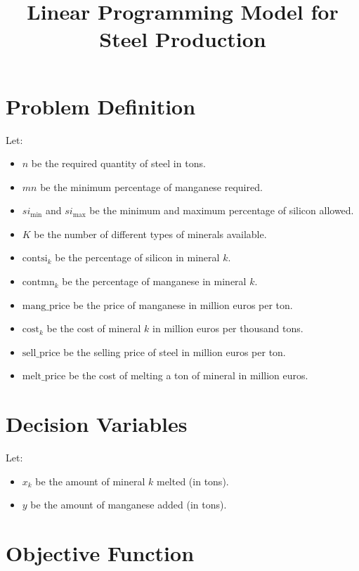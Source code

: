 \documentclass{article}
\begin{document}
\title{Linear Programming Model for Steel Production}
\author{}
\date{}
\maketitle

\section*{Problem Definition}

Let:
\begin{itemize}
    \item \( n \) be the required quantity of steel in tons.
    \item \( mn \) be the minimum percentage of manganese required.
    \item \( si_{\text{min}} \) and \( si_{\text{max}} \) be the minimum and maximum percentage of silicon allowed.
    \item \( K \) be the number of different types of minerals available.
    \item \( \text{contsi}_k \) be the percentage of silicon in mineral \( k \).
    \item \( \text{contmn}_k \) be the percentage of manganese in mineral \( k \).
    \item \( \text{mang\_price} \) be the price of manganese in million euros per ton.
    \item \( \text{cost}_k \) be the cost of mineral \( k \) in million euros per thousand tons.
    \item \( \text{sell\_price} \) be the selling price of steel in million euros per ton.
    \item \( \text{melt\_price} \) be the cost of melting a ton of mineral in million euros.
\end{itemize}

\section*{Decision Variables}

Let:
\begin{itemize}
    \item \( x_k \) be the amount of mineral \( k \) melted (in tons).
    \item \( y \) be the amount of manganese added (in tons).
\end{itemize}

\section*{Objective Function}
\end{document}
